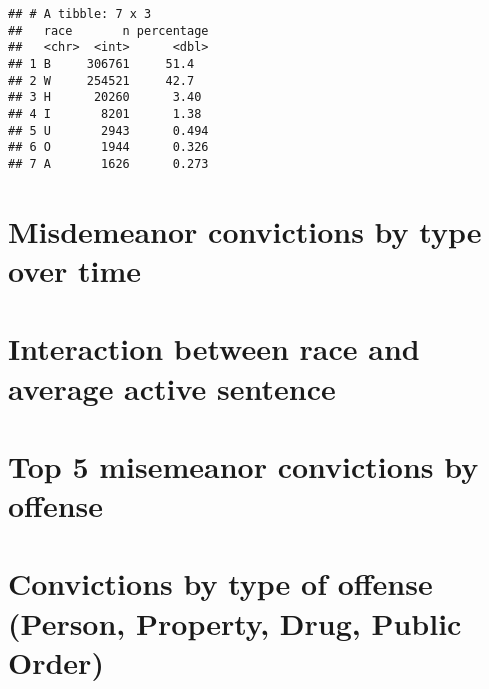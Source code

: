 \documentclass[
]{article}
\begin{document}
\begin{verbatim}
## # A tibble: 7 x 3
##   race       n percentage
##   <chr>  <int>      <dbl>
## 1 B     306761     51.4  
## 2 W     254521     42.7  
## 3 H      20260      3.40 
## 4 I       8201      1.38 
## 5 U       2943      0.494
## 6 O       1944      0.326
## 7 A       1626      0.273
\end{verbatim}

\hypertarget{misdemeanor-convictions-by-type-over-time}{%
\section{Misdemeanor convictions by type over
time}\label{misdemeanor-convictions-by-type-over-time}}

\hypertarget{interaction-between-race-and-average-active-sentence}{%
\section{Interaction between race and average active
sentence}\label{interaction-between-race-and-average-active-sentence}}

\hypertarget{top-5-misemeanor-convictions-by-offense}{%
\section{Top 5 misemeanor convictions by
offense}\label{top-5-misemeanor-convictions-by-offense}}

\hypertarget{convictions-by-type-of-offense-person-property-drug-public-order}{%
\section{Convictions by type of offense (Person, Property, Drug, Public
Order)}\label{convictions-by-type-of-offense-person-property-drug-public-order}}
\end{document}
